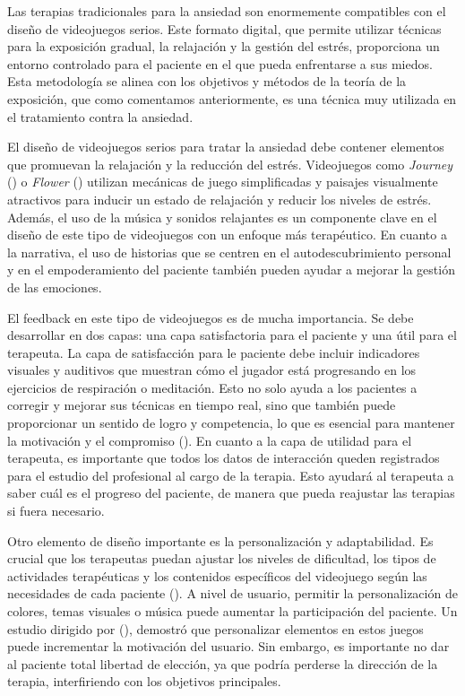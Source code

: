 Las terapias tradicionales para la ansiedad son enormemente compatibles con el diseño de videojuegos serios. Este formato digital, que permite utilizar técnicas para la exposición gradual, la relajación y la gestión del estrés, proporciona un entorno controlado para el paciente en el que pueda enfrentarse a sus miedos. Esta metodología se alinea con los objetivos y métodos de la teoría de la exposición, que como comentamos anteriormente, es una técnica muy utilizada en el tratamiento contra la ansiedad.	

El diseño de videojuegos serios para tratar la ansiedad debe contener elementos que promuevan la relajación y la reducción del estrés. Videojuegos como \textit{Journey} (\cite{JOURNEY:2012}) o \textit{Flower} (\cite{FLOWER:2009}) utilizan mecánicas de juego simplificadas y paisajes visualmente atractivos para inducir un estado de relajación y reducir los niveles de estrés. Además, el uso de la música y sonidos relajantes es un componente clave en el diseño de este tipo de videojuegos con un enfoque más terapéutico. En cuanto a la narrativa, el uso de historias que se centren en el autodescubrimiento personal y en el empoderamiento del paciente también pueden ayudar a mejorar la gestión de las emociones.

El feedback en este tipo de videojuegos es de mucha importancia. Se debe desarrollar en dos capas: una capa satisfactoria para el paciente y una útil para el terapeuta. La capa de satisfacción para le paciente debe incluir indicadores visuales y auditivos que muestran cómo el jugador está progresando en los ejercicios de respiración o meditación. Esto no solo ayuda a los pacientes a corregir y mejorar sus técnicas en tiempo real, sino que también puede proporcionar un sentido de logro y competencia, lo que es esencial para mantener la motivación y el compromiso (\cite{CONNOLLY:2012}). En cuanto a la capa de utilidad para el terapeuta, es importante que todos los datos de interacción queden registrados para el estudio del profesional al cargo de la terapia. Esto ayudará al terapeuta a saber cuál es el progreso del paciente, de manera que pueda reajustar las terapias si fuera necesario.

Otro elemento de diseño importante es la personalización y adaptabilidad. Es crucial que los terapeutas puedan ajustar los niveles de dificultad, los tipos de actividades terapéuticas y los contenidos específicos del videojuego según las necesidades de cada paciente (\cite{BOUCHARD:2017}). A nivel de usuario, permitir la personalización de colores, temas visuales o música puede aumentar la participación del paciente. Un estudio dirigido por \citeauthor{FREITAS:2011} (\citeyear{FREITAS:2011}), demostró que personalizar elementos en estos juegos puede incrementar la motivación del usuario. Sin embargo, es importante no dar al paciente total libertad de elección, ya que podría perderse la dirección de la terapia, interfiriendo con los objetivos principales.

